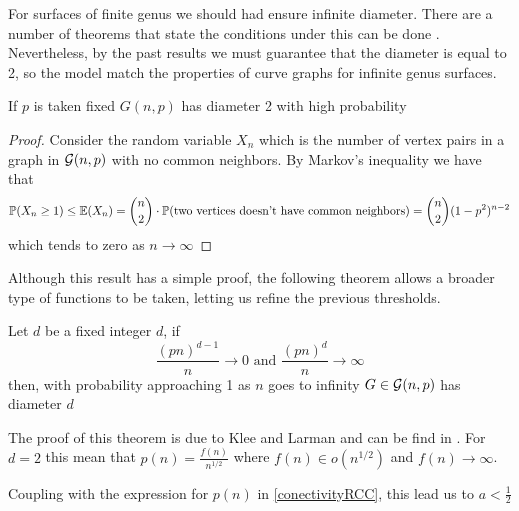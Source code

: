For surfaces of finite genus we should had ensure infinite diameter. There are a number of theorems that state the conditions under this can be done \cite[Bollobás, p.~259]{Bollobas}. Nevertheless, by the past results we must guarantee that the diameter is equal to 2, so the model match the properties of curve graphs for infinite genus surfaces.

\begin{theorem}
If $p$ is taken fixed $G(n,p)$ has diameter 2 with high probability 
\end{theorem}

\begin{proof}
Consider the random variable $X_{n}$ which is the number of vertex pairs in a graph in $\mathcal{G}(n,p)$ with no common neighbors. By Markov's inequality we have that
$$\mathbb{P}(X_{n} \geq 1)\leq \mathbb{E}(X_{n}) = \binom{n}{2} \cdot \mathbb{P}(\text{two vertices doesn't have common neighbors}) = \binom{n}{2} (1-p^{2})^{n-2}$$
which tends to zero as $n\to \infty$
\end{proof}

Although this result has a simple proof, the following theorem allows a broader type of functions to be taken, letting us refine the previous thresholds.

\begin{theorem}
Let $d$ be a fixed integer $d$, if 
$$\frac{(pn)^{d-1}}{n} \to 0 \text{ and } \frac{(pn)^{d}}{n} \to \infty $$
then, with probability approaching 1 as $n$ goes to infinity $G\in\mathcal{G}(n,p)$ has diameter $d$
\end{theorem}

The proof of this theorem is due to Klee and Larman and can be find in \cite[Klee, Larman 81]{diameters}. For $d=2$ this mean that $p(n)= \frac{f(n)}{n^{1/2}}$ where $f(n)\in o(n^{1/2})$ and $f(n)\to \infty$.

Coupling with the expression for $p(n)$ in \ref{conectivityRCC}, this lead us to $a<\frac{1}{2}$




